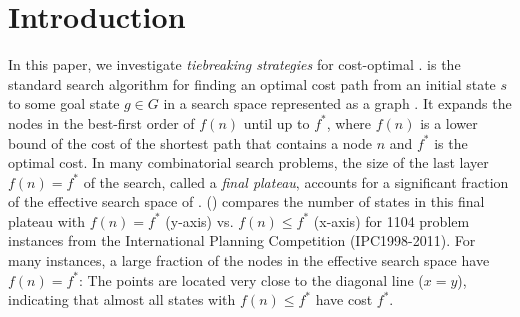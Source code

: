 
\section{Introduction}
\label{sec:introduction}

In this paper, we investigate \emph{tiebreaking strategies} for cost-optimal \astar.
\astar is the standard search algorithm for finding an optimal cost path from an initial state $s$ to some goal
state $g \in G$ in a search space represented as a graph \cite{hart1968formal}.
It expands the nodes in the best-first order of $f(n)$ until up to $f^*$,
where $f(n)$ is a lower bound of the cost of the shortest path that contains a node $n$ and $f^*$ is the optimal cost.
% 
In many combinatorial search problems, the size of the last layer $f(n)=f^*$ of the search, called a \emph{final plateau},
accounts for a significant fraction of the effective search space of \astar.  
() compares the number of states in this final plateau with $f(n) = f^*$ (y-axis)
vs. $f(n) \leq f^*$ (x-axis) for 1104 problem instances from the International Planning Competition (IPC1998-2011).
For many instances, a large fraction of the nodes in the effective search space have $f(n)=f^*$: The points
are located very close to the diagonal line ($x=y$), indicating that almost all states with $f(n) \leq f^*$ have cost
$f^*$.

